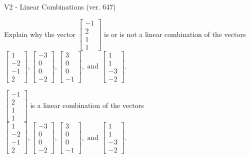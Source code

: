 \begin{exercise}
  \begin{exerciseTitle}V2 - Linear Combinations (ver. 647)\end{exerciseTitle}
  \begin{exerciseStatement}
    Explain why the vector \(\left[\begin{array}{c}
-1 \\
2 \\
1 \\
1
\end{array}\right]\)  is or is not a linear 
	combination of the vectors \(\left[\begin{array}{c}
1 \\
-2 \\
-1 \\
2
\end{array}\right] , \left[\begin{array}{c}
-3 \\
0 \\
0 \\
-2
\end{array}\right] , \left[\begin{array}{c}
3 \\
0 \\
0 \\
-1
\end{array}\right] , \text{ and } \left[\begin{array}{c}
1 \\
1 \\
-3 \\
-2
\end{array}\right]\).
	


  \end{exerciseStatement}
  \begin{exerciseAnswer}
   \(\left[\begin{array}{c}
-1 \\
2 \\
1 \\
1
\end{array}\right]\) 
  	 is  
	a linear combination of the vectors \(\left[\begin{array}{c}
1 \\
-2 \\
-1 \\
2
\end{array}\right] , \left[\begin{array}{c}
-3 \\
0 \\
0 \\
-2
\end{array}\right] , \left[\begin{array}{c}
3 \\
0 \\
0 \\
-1
\end{array}\right] , \text{ and } \left[\begin{array}{c}
1 \\
1 \\
-3 \\
-2
\end{array}\right]\).


\end{exerciseAnswer}
\end{exercise}
